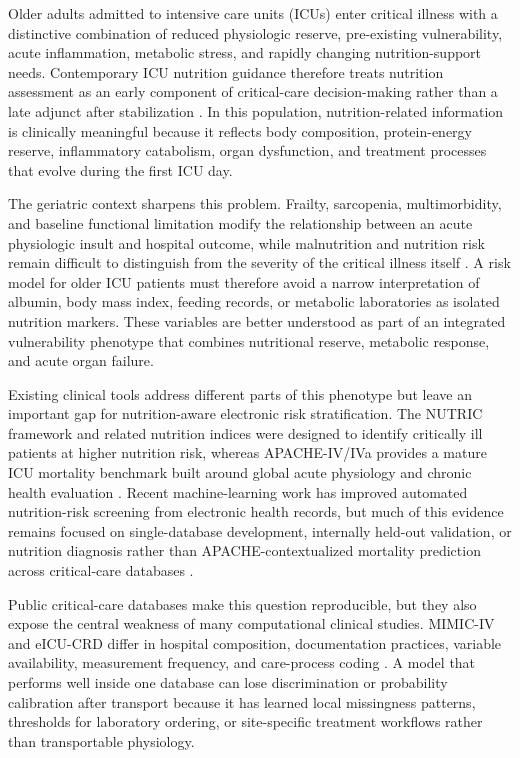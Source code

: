 \documentclass[utf8]{FrontiersinVancouver}
\begin{document}
Older adults admitted to intensive care units (ICUs) enter critical illness with a distinctive combination of reduced physiologic reserve, pre-existing vulnerability, acute inflammation, metabolic stress, and rapidly changing nutrition-support needs. Contemporary ICU nutrition guidance therefore treats nutrition assessment as an early component of critical-care decision-making rather than a late adjunct after stabilization \citep{Singer2023ESPENPractical,Compher2022ASPEN,deMan2024ICUNutrition}. In this population, nutrition-related information is clinically meaningful because it reflects body composition, protein-energy reserve, inflammatory catabolism, organ dysfunction, and treatment processes that evolve during the first ICU day.

The geriatric context sharpens this problem. Frailty, sarcopenia, multimorbidity, and baseline functional limitation modify the relationship between an acute physiologic insult and hospital outcome, while malnutrition and nutrition risk remain difficult to distinguish from the severity of the critical illness itself \citep{Compher2025GLIMCriticalIllness,Moisi2024Frailty,Inaba2023Frailty}. A risk model for older ICU patients must therefore avoid a narrow interpretation of albumin, body mass index, feeding records, or metabolic laboratories as isolated nutrition markers. These variables are better understood as part of an integrated vulnerability phenotype that combines nutritional reserve, metabolic response, and acute organ failure.

Existing clinical tools address different parts of this phenotype but leave an important gap for nutrition-aware electronic risk stratification. The NUTRIC framework and related nutrition indices were designed to identify critically ill patients at higher nutrition risk, whereas APACHE-IV/IVa provides a mature ICU mortality benchmark built around global acute physiology and chronic health evaluation \citep{Heyland2011NUTRIC,Peng2023GNRI,Zimmerman2006ApacheIV}. Recent machine-learning work has improved automated nutrition-risk screening from electronic health records, but much of this evidence remains focused on single-database development, internally held-out validation, or nutrition diagnosis rather than APACHE-contextualized mortality prediction across critical-care databases \citep{Zhang2026ENUTRIC,Cao2026NIM}.

Public critical-care databases make this question reproducible, but they also expose the central weakness of many computational clinical studies. MIMIC-IV and eICU-CRD differ in hospital composition, documentation practices, variable availability, measurement frequency, and care-process coding \citep{Johnson2023MIMICIV,Pollard2018EICU}. A model that performs well inside one database can lose discrimination or probability calibration after transport because it has learned local missingness patterns, thresholds for laboratory ordering, or site-specific treatment workflows rather than transportable physiology.
\end{document}
